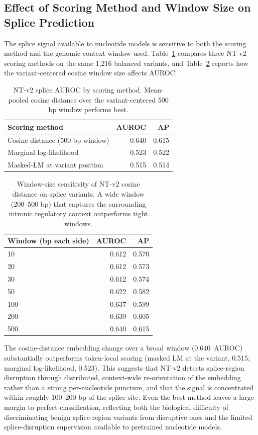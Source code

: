 \documentclass[9pt]{article}
\begin{document}
\subsection{Effect of Scoring Method and Window Size on Splice Prediction}

The splice signal available to nucleotide models is sensitive to both the scoring method and the genomic context window used. Table~\ref{tab:splice_method} compares three NT-v2 scoring methods on the same 1,216 balanced variants, and Table~\ref{tab:splice_window} reports how the variant-centered cosine window size affects AUROC.

\begin{table}[h]
\centering
\caption{NT-v2 splice AUROC by scoring method. Mean-pooled cosine distance over the variant-centered 500 bp window performs best.}
\label{tab:splice_method}
\small
\begin{tabular}{lrr}
\toprule
\textbf{Scoring method} & \textbf{AUROC} & \textbf{AP} \\
\midrule
Cosine distance (500 bp window) & 0.640 & 0.615 \\
Marginal log-likelihood & 0.523 & 0.522 \\
Masked-LM at variant position & 0.515 & 0.514 \\
\bottomrule
\end{tabular}
\end{table}

\begin{table}[h]
\centering
\caption{Window-size sensitivity of NT-v2 cosine distance on splice variants. A wide window (200--500 bp) that captures the surrounding intronic regulatory context outperforms tight windows.}
\label{tab:splice_window}
\small
\begin{tabular}{lrr}
\toprule
\textbf{Window (bp each side)} & \textbf{AUROC} & \textbf{AP} \\
\midrule
10 & 0.612 & 0.570 \\
20 & 0.612 & 0.573 \\
30 & 0.612 & 0.574 \\
50 & 0.622 & 0.582 \\
100 & 0.637 & 0.599 \\
200 & 0.639 & 0.605 \\
500 & 0.640 & 0.615 \\
\bottomrule
\end{tabular}
\end{table}

The cosine-distance embedding change over a broad window (0.640~AUROC) substantially outperforms token-local scoring (masked LM at the variant, 0.515; marginal log-likelihood, 0.523). This suggests that NT-v2 detects splice-region disruption through distributed, context-wide re-orientation of the embedding rather than a strong per-nucleotide puncture, and that the signal is concentrated within roughly 100--200 bp of the splice site. Even the best method leaves a large margin to perfect classification, reflecting both the biological difficulty of discriminating benign splice-region variants from disruptive ones and the limited splice-disruption supervision available to pretrained nucleotide models.
\end{document}

